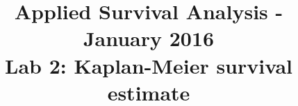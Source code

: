 \documentclass[11pt,a4paper]{article}
\begin{document}
\title{Applied Survival Analysis - January 2016\\Lab 2: Kaplan-Meier survival estimate}
\date{\vspace{-10ex}}
\author{\vspace{-10ex}}
\maketitle

\end{document}
